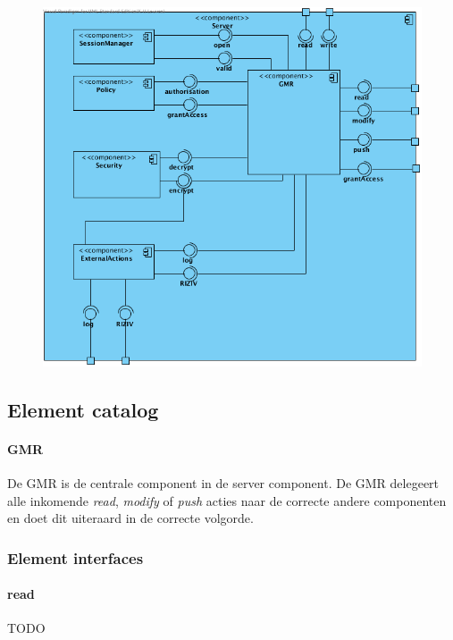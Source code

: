 \documentclass[a4paper,10pt]{book}
\begin{document}
\begin{center}
    \begin{figure}
      \includegraphics[width=\textwidth]{../images/ClientServer_Server.png}
    \end{figure}
  \end{center}

\subsection{Element catalog}

\paragraph{GMR}
De GMR is de centrale component in de server component.  De GMR delegeert alle inkomende \textit{read}, \textit{modify} of \textit{push} acties naar de correcte andere componenten en doet dit uiteraard in de correcte volgorde.

\subsubsection{Element interfaces} 

\paragraph{read}
TODO
\end{document}
